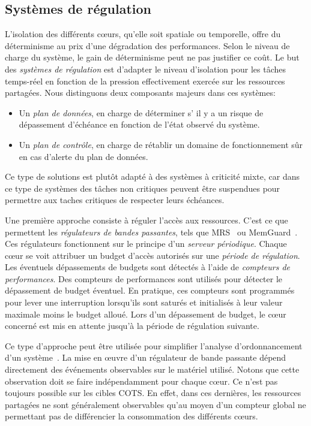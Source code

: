 \subsection{Systèmes de régulation}

L'isolation des différents cœurs, qu’elle soit spatiale ou temporelle, offre du déterminisme au prix d'une dégradation des performances.
Selon le niveau de charge du système, le gain de déterminisme peut ne pas justifier ce coût.
Le but des \emph{systèmes de régulation} est d'adapter le niveau d'isolation pour les tâches temps-réel en fonction de la pression effectivement exercée sur les ressources partagées.
Nous distinguons deux composants majeurs dans ces systèmes:
\begin{itemize}
	\item Un \emph{plan de données}, en charge de déterminer s’ il y a un risque de dépassement d'échéance en fonction de l'état observé du système.
	\item Un \emph{plan de contrôle}, en charge de rétablir un domaine de fonctionnement sûr en cas d'alerte du plan de données.
\end{itemize}
Ce type de solutions est plutôt adapté à des systèmes à criticité mixte, car dans ce type de systèmes des tâches non critiques peuvent être suspendues pour permettre aux taches critiques de respecter leurs échéances.


Une première approche consiste à réguler l'accès aux ressources.
C'est ce que permettent les \emph{régulateurs de bandes passantes}, tels que MRS~\cite{inam2014multi} ou MemGuard~\cite{yun2013memguard}.
Ces régulateurs fonctionnent sur le principe d'un \emph{serveur périodique}.
Chaque cœur se voit attribuer un budget d'accès autorisés sur une \emph{période de régulation}.
Les éventuels dépassements de budgets sont détectés à l'aide de \emph{compteurs de performances}.
Des compteurs de performances sont utilisés pour détecter le dépassement de budget éventuel.
En pratique, ces compteurs sont programmés pour lever une interruption lorsqu'ils sont saturés et initialisés à leur valeur maximale moins le budget alloué.
Lors d'un dépassement de budget, le cœur concerné est mis en attente jusqu'à la période de régulation suivante.

Ce type d'approche peut être utilisée pour simplifier l'analyse d'ordonnancement d'un système~\cite{pellizzoni2016memory,agrawal2017contention}.
La mise en œuvre d'un régulateur de bande passante dépend directement des événements observables sur le matériel utilisé.
Notons que cette observation doit se faire indépendamment pour chaque cœur.
Ce n'est pas toujours possible sur les cibles COTS.
En effet, dans ces dernières, les ressources partagées ne sont généralement observables qu'au moyen d'un compteur global ne permettant pas de différencier la consommation des différents cœurs.

